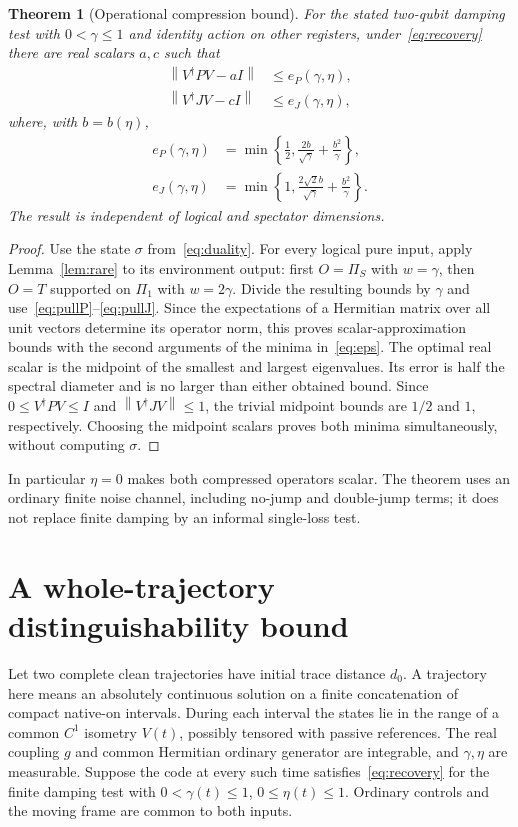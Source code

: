 \documentclass[11pt]{article}
\newtheorem{theorem}{Theorem}
\newcommand{\norm}[1]{\left\lVert#1\right\rVert}
\begin{document}
\begin{theorem}[Operational compression bound]\label{thm:compression}
For the stated two-qubit damping test with $0<\gamma\leq1$ and identity action on other registers, under~\eqref{eq:recovery} there are real scalars $a,c$ such that
\begin{align}
 \norm{V^\dagger PV-aI}&\leq e_P(\gamma,\eta),\\
 \norm{V^\dagger JV-cI}&\leq e_J(\gamma,\eta),\label{eq:compression}
\end{align}
where, with $b=b(\eta)$,
\begin{align}
 e_P(\gamma,\eta)&=\min\left\{\tfrac12,
                 \frac{2b}{\sqrt\gamma}+\frac{b^2}{\gamma}\right\},\\
 e_J(\gamma,\eta)&=\min\left\{1,
                 \frac{2\sqrt2b}{\sqrt\gamma}+\frac{b^2}{\gamma}\right\}.\label{eq:eps}
\end{align}
The result is independent of logical and spectator dimensions.
\end{theorem}
\begin{proof}
Use the state $\sigma$ from~\eqref{eq:duality}. For every logical pure input, apply Lemma~\ref{lem:rare} to its environment output: first $O=\Pi_S$ with $w=\gamma$, then $O=T$ supported on $\Pi_1$ with $w=2\gamma$. Divide the resulting bounds by $\gamma$ and use~\eqref{eq:pullP}--\eqref{eq:pullJ}. Since the expectations of a Hermitian matrix over all unit vectors determine its operator norm, this proves scalar-approximation bounds with the second arguments of the minima in~\eqref{eq:eps}. The optimal real scalar is the midpoint of the smallest and largest eigenvalues. Its error is half the spectral diameter and is no larger than either obtained bound. Since $0\leq V^\dagger PV\leq I$ and $\norm{V^\dagger JV}\leq1$, the trivial midpoint bounds are $1/2$ and $1$, respectively. Choosing the midpoint scalars proves both minima simultaneously, without computing $\sigma$.
\end{proof}
In particular $\eta=0$ makes both compressed operators scalar. The theorem uses an ordinary finite noise channel, including no-jump and double-jump terms; it does not replace finite damping by an informal single-loss test.

\section{A whole-trajectory distinguishability bound}
Let two complete clean trajectories have initial trace distance $d_0$. A trajectory here means an absolutely continuous solution on a finite concatenation of compact native-on intervals. During each interval the states lie in the range of a common $C^1$ isometry $V(t)$, possibly tensored with passive references. The real coupling $g$ and common Hermitian ordinary generator are integrable, and $\gamma,\eta$ are measurable. Suppose the code at every such time satisfies~\eqref{eq:recovery} for the finite damping test with $0<\gamma(t)\leq1$, $0\leq\eta(t)\leq1$. Ordinary controls and the moving frame are common to both inputs.
\end{document}
